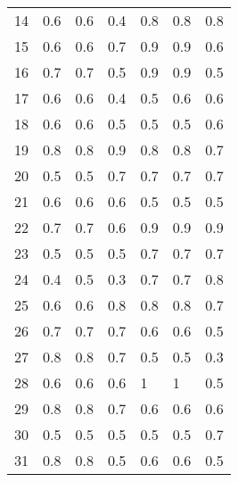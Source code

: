 \begin{table}[]
\begin{tabular}{l|lll|lll}
14              & 0.6                  & 0.6       & 0.4     & 0.8     & 0.8 & 0.8     \\
15              & 0.6                  & 0.6       & 0.7     & 0.9     & 0.9 & 0.6     \\
16              & 0.7                  & 0.7       & 0.5     & 0.9     & 0.9 & 0.5     \\
17              & 0.6                  & 0.6       & 0.4     & 0.5     & 0.6 & 0.6     \\
18              & 0.6                  & 0.6       & 0.5     & 0.5     & 0.5 & 0.6     \\
19              & 0.8                  & 0.8       & 0.9     & 0.8     & 0.8 & 0.7     \\
20              & 0.5                  & 0.5       & 0.7     & 0.7     & 0.7 & 0.7     \\
21              & 0.6                  & 0.6       & 0.6     & 0.5     & 0.5 & 0.5     \\
22              & 0.7                  & 0.7       & 0.6     & 0.9     & 0.9 & 0.9     \\
23              & 0.5                  & 0.5       & 0.5     & 0.7     & 0.7 & 0.7     \\
24              & 0.4                  & 0.5       & 0.3     & 0.7     & 0.7 & 0.8     \\
25              & 0.6                  & 0.6       & 0.8     & 0.8     & 0.8 & 0.7     \\
26              & 0.7                  & 0.7       & 0.7     & 0.6     & 0.6 & 0.5     \\
27              & 0.8                  & 0.8       & 0.7     & 0.5     & 0.5 & 0.3     \\
28              & 0.6                  & 0.6       & 0.6     & 1       & 1   & 0.5     \\
29              & 0.8                  & 0.8       & 0.7     & 0.6     & 0.6 & 0.6     \\
30              & 0.5                  & 0.5       & 0.5     & 0.5     & 0.5 & 0.7     \\
31              & 0.8                  & 0.8       & 0.5     & 0.6     & 0.6 & 0.5     \\
\end{tabular}
\end{table}
\clearpage
